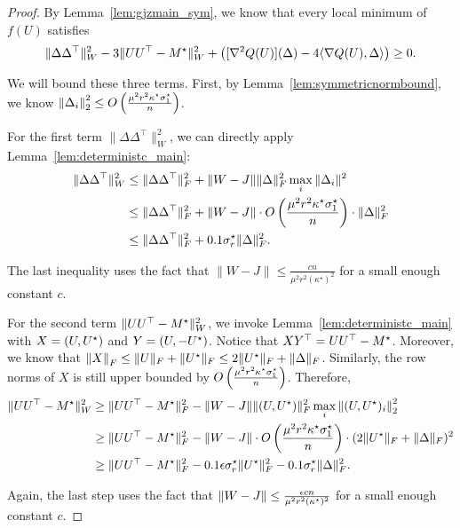 \begin{proof}
By Lemma~\ref{lem:gjzmain_sym}, we know that every local minimum of $f(U)$ satisfies
\[
\|\Delta\Delta^\top\|_W^2 - 3\|UU^\top - M^\star\|_W^2 + \left([\nabla^2 Q(U)](\Delta) - 4\langle \nabla Q(U), \Delta\rangle\right) \ge 0.
\]

We will bound these three terms. First, by Lemma~\ref{lem:symmetricnormbound}, we know ${\lVert\Delta_i{\rVert}}_2^2 \le O\left(\frac{\mu^2 r^2 \kappa^\star \sigma^\star_1}{n}\right)$. 

For the first term $\|\Delta\Delta^\top\|_W^2$, we can directly apply Lemma~\ref{lem:deterministc_main}:
\begin{align*}
\|\Delta\Delta^\top\|_W^2 & \le \|\Delta\Delta^\top\|_F^2 + \|W-J\|\|\Delta\|_F^2 \max_i \|\Delta_i\|^2 \\
& \le \|\Delta\Delta^\top\|_F^2 + \|W-J\|\cdot O\left(\frac{\mu^2 r^2 \kappa^\star \sigma^\star_1}{n}\right)\cdot \|\Delta\|_F^2 \\
& \le \|\Delta\Delta^\top\|_F^2 + 0.1\sigma^\star_r \|\Delta\|_F^2.
\end{align*}

The last inequality uses the fact that $\|W-J\| \le \frac{cn}{\mu^2 r^2 (\kappa^\star)^2}$ for a small enough constant $c$. 

For the second term $\|UU^\top - M^\star\|_W^2$, we invoke Lemma~\ref{lem:deterministc_main} with $X = (U, U^\star)$ and $Y = (U, -U^\star)$.
Notice that $X Y^\top = UU^\top - M^\star$.
Moreover, we know that ${\lVert X{\rVert}}_F \le \|U\|_F + \|U^\star\|_F \le 2\|U^\star\|_F + \|\Delta\|_F$. Similarly, the row norms of $X$ is still upper bounded by $O\left(\frac{\mu^2 r^2 \kappa^\star \sigma^\star_1}{n}\right)$. Therefore,
\begin{align*}
\|UU^\top - M^\star\|_W^2 & \ge \|UU^\top - M^\star\|_F^2 - \|W-J\|\|(U,U^\star)\|_F^2 \max_i {\lVert(U,U^\star)_i{\rVert}}_2^2 \\
& \ge \|UU^\top - M^\star\|_F^2 - \|W-J\|\cdot O\left(\frac{\mu^2 r^2 \kappa^\star \sigma^\star_1}{n}\right)\cdot (2\|U^\star\|_F + \|\Delta\|_F)^2 \\
& \ge \|UU^\top - M^\star\|_F^2 - 0.1 \epsilon\sigma^\star_r \|U^\star\|_F^2 -0.1\sigma^\star_r \|\Delta\|_F^2.
\end{align*}

Again, the last step uses the fact that $\|W-J\| \le \frac{\epsilon cn}{\mu^2 r^2 (\kappa^\star)^2}$ for a small enough constant $c$. 


\end{proof}
